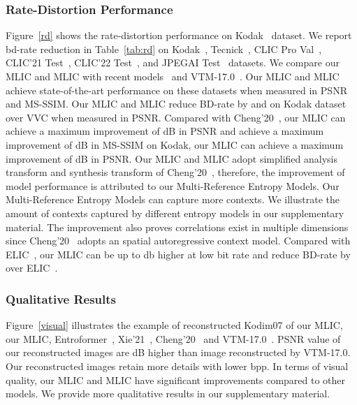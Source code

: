 \documentclass[sigconf]{acmart}
\begin{document}
\subsubsection{Rate-Distortion Performance}
Figure~\ref{rd} shows the rate-distortion performance on Kodak~\cite{kodak} dataset.
We report bd-rate reduction in Table~\ref{tab:rd} on Kodak~\cite{kodak},
Tecnick~\cite{asuni2014testimages}, CLIC Pro Val~\cite{clic2020dataset},
CLIC'21 Test~\cite{clic2021dataset}, CLIC'22 Test~\cite{clic2022dataset},
and JPEGAI Test~\cite{jpegai} datasets.
We compare our MLIC and MLIC with recent
models~\cite{DBLP:conf/cvpr/ChengSTK20, DBLP:conf/icip/MinnenS20,
DBLP:conf/iclr/QianTSLLSHJ21,DBLP:conf/mm/XieCC21,
DBLP:journals/corr/abs-2202-05492,DBLP:journals/corr/abs-2203-08450,
He_2022_CVPR,Wang_2022_CVPR,DBLP:journals/corr/abs-2203-10897, zhu2021transformer,
DBLP:journals/corr/abs-2112-04487, pan2022content, koyuncu2022contextformer}
and VTM-17.0~\cite{vtm2019}.
Our MLIC and MLIC achieve state-of-the-art performance on these datasets when measured
in PSNR and MS-SSIM.
Our MLIC and MLIC reduce
BD-rate by  and  on Kodak dataset over VVC when measured in PSNR.
Compared with Cheng'20~\cite{DBLP:conf/cvpr/ChengSTK20},
our MLIC can achieve a maximum improvement of dB in PSNR
and achieve a maximum improvement of dB in MS-SSIM on Kodak,
our MLIC can achieve a maximum improvement of dB in PSNR.
Our MLIC and MLIC adopt simplified analysis transform and synthesis transform of
Cheng'20~\cite{DBLP:conf/cvpr/ChengSTK20}, therefore,
the improvement of model performance is attributed to our Multi-Reference Entropy Models.
Our Multi-Reference Entropy Models can capture more contexts.
We illustrate the amount of contexts captured by different entropy models
in our supplementary material.
The improvement also proves correlations exist in multiple dimensions since
Cheng'20~\cite{DBLP:conf/cvpr/ChengSTK20} adopts an spatial autoregressive context model.
Compared with ELIC~\cite{He_2022_CVPR}, our MLIC can be up to db higher
at low bit rate and reduce BD-rate by  over ELIC~\cite{He_2022_CVPR}.
\subsubsection{Qualitative Results}
    Figure~\ref{visual} illustrates the example of reconstructed Kodim07 of our MLIC,
    our MLIC, Entroformer~\cite{DBLP:journals/corr/abs-2202-05492},
    Xie'21~\cite{DBLP:conf/mm/XieCC21}, Cheng'20~\cite{DBLP:conf/cvpr/ChengSTK20}
    and VTM-17.0~\cite{vtm2019}. PSNR value of our reconstructed images are dB
    higher than image reconstructed by VTM-17.0. Our reconstructed images retain
    more details with lower bpp. In terms of visual quality, our MLIC and MLIC
    have significant improvements compared to other models. We provide more qualitative
    results in our supplementary material.
\end{document}

